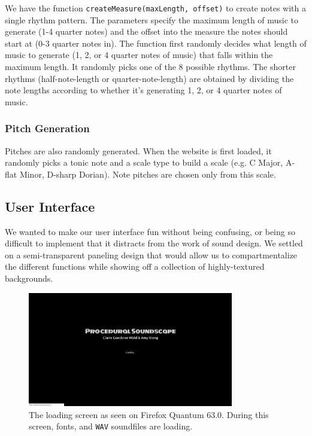 \documentclass[12pt,a4paper]{article}
\newcommand{\code}{\texttt}
\begin{document}
We have the function \code{createMeasure(maxLength, offset)} to create notes with a single rhythm pattern. The parameters specify the maximum length of music to generate (1-4 quarter notes) and the offset into the measure the notes should start at (0-3 quarter notes in). The function first randomly decides what length of music to generate (1, 2, or 4 quarter notes of music) that falls within the maximum length. It randomly picks one of the 8 possible rhythms. The shorter rhythms (half-note-length or quarter-note-length) are obtained by dividing the note lengths according to whether it's generating 1, 2, or 4 quarter notes of music.

\subsubsection{Pitch Generation}

Pitches are also randomly generated. When the website is first loaded, it randomly picks a tonic note and a scale type to build a scale (e.g. C Major, A-flat Minor, D-sharp Dorian). Note pitches are chosen only from this scale.

\subsection{User Interface}
We wanted to make our user interface fun without being confusing, or being so difficult to implement that it distracts from the work of sound design. We settled on a semi-transparent paneling design that would allow us to compartmentalize the different functions while showing off a collection of highly-textured backgrounds.

\begin{figure}
\centering\includegraphics[width=0.8\textwidth]{images/loading.png}
\caption{The loading screen as seen on Firefox Quantum 63.0. During this screen, fonts, and \code{WAV} soundfiles are loading.}
\end{figure}
\end{document}
